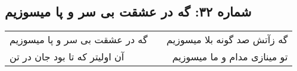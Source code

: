 \begin{center}
\section*{شماره ۳۲: گه در عشقت بی سر و پا میسوزیم}
\label{sec:032}
\begin{longtable}{l p{0.5cm} r}
گه در عشقت بی سر و پا میسوزیم
&&
گه زآتش صد گونه بلا میسوزیم
\\
آن اولیتر که تا بود جان در تن
&&
تو مینازی مدام و ما میسوزیم
\\
\end{longtable}
\end{center}
